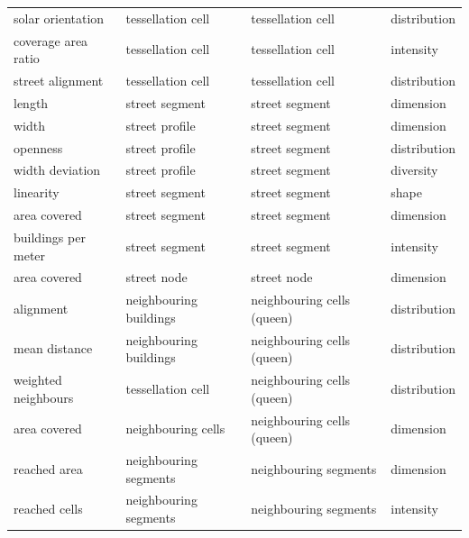 \begin{longtable}{p{5cm}p{4cm}p{4cm}l}
                    solar orientation &               tessellation cell &          tessellation cell & distribution \\
                    coverage area ratio &               tessellation cell &          tessellation cell &    intensity \\
                    street alignment &               tessellation cell &          tessellation cell & distribution \\
                                length &                  street segment &             street segment &    dimension \\
                                width &                  street profile &             street segment &    dimension \\
                            openness &                  street profile &             street segment & distribution \\
                        width deviation &                  street profile &             street segment &    diversity \\
                            linearity &                  street segment &             street segment &        shape \\
                        area covered &                  street segment &             street segment &    dimension \\
                    buildings per meter &                  street segment &             street segment &    intensity \\
                        area covered &                     street node &                street node &    dimension \\
                            alignment &          neighbouring buildings & neighbouring cells (queen) & distribution \\
                        mean distance &          neighbouring buildings & neighbouring cells (queen) & distribution \\
                    weighted neighbours &               tessellation cell & neighbouring cells (queen) & distribution \\
                        area covered &              neighbouring cells & neighbouring cells (queen) &    dimension \\
                        reached area &           neighbouring segments &      neighbouring segments &    dimension \\
                        reached cells &           neighbouring segments &      neighbouring segments &    intensity \\

\end{longtable}
